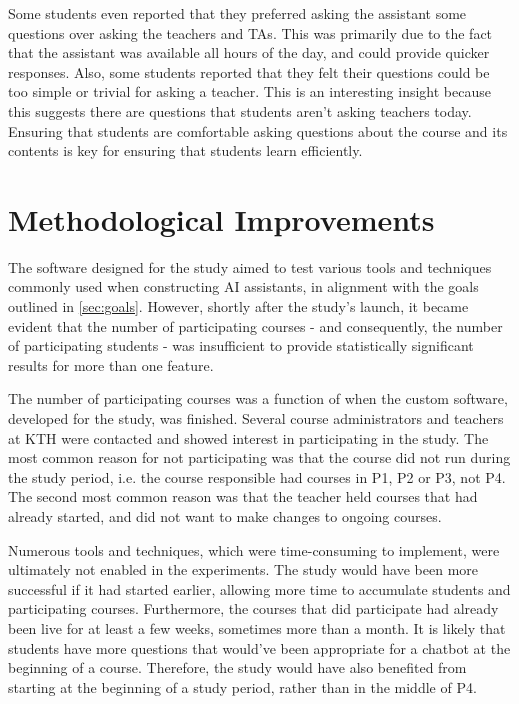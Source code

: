 Some students even reported that they preferred asking the assistant some questions over asking the teachers and TAs. This was primarily due to the fact that the assistant was available all hours of the day, and could provide quicker responses. Also, some students reported that they felt their questions could be too simple or trivial for asking a teacher. This is an interesting insight because this suggests there are questions that students aren’t asking teachers today. Ensuring that students are comfortable asking questions about the course and its contents is key for ensuring that students learn efficiently.


\section{Methodological Improvements}


The software designed for the study aimed to test various tools and techniques commonly used when constructing AI assistants, in alignment with the goals outlined in \ref{sec:goals}. However, shortly after the study's launch, it became evident that the number of participating courses - and consequently, the number of participating students - was insufficient to provide statistically significant results for more than one feature.


The number of participating courses was a function of when the custom software, developed for the study, was finished. Several course administrators and teachers at KTH were contacted and showed interest in participating in the study. The most common reason for not participating was that the course did not run during the study period, i.e. the course responsible had courses in P1, P2 or P3, not P4. The second most common reason was that the teacher held courses that had already started, and did not want to make changes to ongoing courses.


Numerous tools and techniques, which were time-consuming to implement, were ultimately not enabled in the experiments. The study would have been more successful if it had started earlier, allowing more time to accumulate students and participating courses. Furthermore, the courses that did participate had already been live for at least a few weeks, sometimes more than a month. It is likely that students have more questions that would’ve been appropriate for a chatbot at the beginning of a course. Therefore, the study would have also benefited from starting at the beginning of a study period, rather than in the middle of P4.


